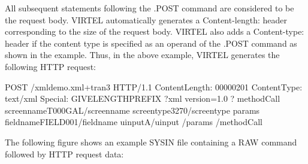\documentclass[letterpaper,10pt,english]{sphinxmanual}
\begin{document}
All subsequent statements following the .POST command are considered to be the request body. VIRTEL automatically
generates a Content-length: header corresponding to the size of the request body. VIRTEL also adds a Content-type:
header if the content type is specified as an operand of the .POST command as shown in the example. Thus, in the
above example, VIRTEL generates the following HTTP request:

\begin{sphinxVerbatim}[commandchars=\\\{\}]
POST /xmldemo.xml+tran3 HTTP/1.1
Content\PYGZhy{}Length: 00000201
Content\PYGZhy{}Type: text/xml
Special: GIVE\PYGZhy{}LENGTH\PYGZhy{}PREFIX
\PYGZlt{}?xml version=\PYGZdq{}1.0\PYGZdq{} ?\PYGZgt{}
\PYGZlt{}methodCall\PYGZgt{}
\PYGZlt{}screenname\PYGZgt{}T000\PYGZhy{}GAL\PYGZlt{}/screenname\PYGZgt{}
\PYGZlt{}screentype\PYGZgt{}3270\PYGZlt{}/screentype\PYGZgt{}
\PYGZlt{}params\PYGZgt{}
\PYGZlt{}fieldname\PYGZgt{}FIELD001\PYGZlt{}/fieldname\PYGZgt{}
\PYGZlt{}uinput\PYGZgt{}A\PYGZlt{}/uinput\PYGZgt{}
\PYGZlt{}/params\PYGZgt{}
\PYGZlt{}/methodCall\PYGZgt{}
\end{sphinxVerbatim}



The following figure shows an example SYSIN file containing a RAW command followed by HTTP request data:
\end{document}
